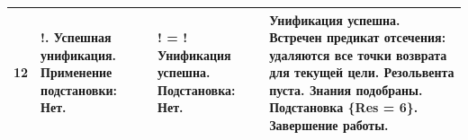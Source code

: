 \begin{tabularx}{\textwidth}{|c|>{\small}X|>{\small}X|>{\small}X|}
	12                                                                                 &
	!. \newline
	Успешная унификация. \newline
	Применение подстановки: \newline
	Нет.                                                                               &
	! = \newline
	! \newline
	Унификация успешна. \newline
	Подстановка: \newline
	Нет.                                                                               &
	Унификация успешна. \newline
	Встречен предикат отсечения: удаляются все точки возврата для текущей цели. \newline
	Резольвента пуста. \newline
	Знания подобраны. Подстановка \{Res = 6\}. \newline
	Завершение работы.                                                                   \\
	\hline
\end{tabularx}
